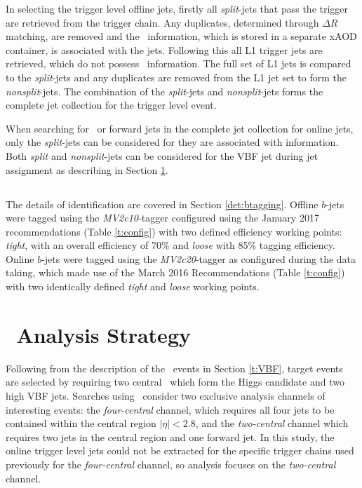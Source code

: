 		In selecting the trigger level offline jets, firstly all \textit{split}-jets that pass the trigger are retrieved from the trigger chain. Any duplicates, determined through $\Delta R$ matching, are removed and the \btag\, information, which is stored in a separate xAOD container, is associated with the jets. Following this all L1 trigger jets are retrieved, which do not possess \btag\, information. The full set of L1 jets is compared to the \textit{split}-jets and any duplicates are removed from the L1 jet set to form the \textit{nonsplit}-jets. The combination of the \textit{split}-jets and \textit{nonsplit}-jets forms the complete jet collection for the trigger level event.

		When searching for \bjets\, or forward jets in the complete jet collection for online jets, only the \textit{split}-jets can be considered for \bjetsas they are associated with \btag information. Both \textit{split} and \textit{nonsplit}-jets can be considered for the VBF jet during jet assignment as describing in Section \ref{es:as}.

		\subsection{\bjets}

		The details of \bjet identification are covered in Section \ref{det:btagging}. Offline $b$-jets were tagged using the \textit{MV2c10}-tagger configured using the January 2017 recommendations (Table \ref{t:config}) with two defined efficiency working points: \textit{tight}, with an overall efficiency of 70\% and \textit{loose} with 85\% tagging efficiency. Online $b$-jets were tagged using the \textit{MV2c20}-tagger as configured during the data taking, which made use of the March 2016 Recommendations (Table \ref{t:config}) with two identically defined \textit{tight} and \textit{loose} working points.


	\section{\VBFHBB\, Analysis Strategy}
	\label{es:as}
		 Following from the description of the \VBFHBB\, events in Section \ref{t:VBF}, target events are selected by requiring two central \bjets\, which form the Higgs candidate and two high \pt VBF jets. Searches using \VBFHBB\, consider two exclusive analysis channels of interesting events: the \textit{four-central} channel, which requires all four jets to be contained within the central region $|\eta| < 2.8$, and the \textit{two-central} channel which requires two jets in the central region and one forward jet. In this study, the online trigger level jets could not be extracted for the specific trigger chains used previously for the \textit{four-central} channel, so analysis focuses on the \textit{two-central} channel.

